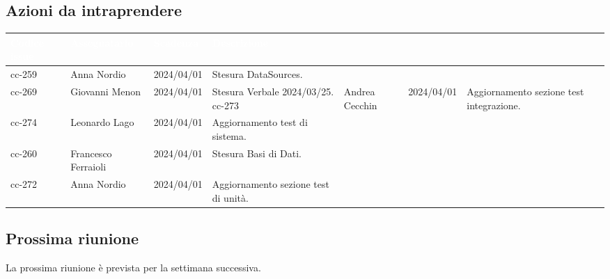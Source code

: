 \subsection{Azioni da intraprendere}
{
    \setlength{\tabcolsep}{10pt}
            \renewcommand{\arraystretch}{1.5}
            \begin{tabularx}{\textwidth}{| l | l | l | X |}
                 \hline
                 \textbf{\textcolor{white}{Codice issue}} & \textbf{\textcolor{white}{Assegnatario}} & \textbf{\textcolor{white}{Scadenza}} & \textbf{\textcolor{white}{Descrizione}} \\
                 \hline
                 cc-259 & Anna Nordio & 2024/04/01 & Stesura DataSources. \\
                 \hline
                 cc-269 & Giovanni Menon & 2024/04/01 & Stesura Verbale 2024/03/25.
                 \hline
                 cc-273 & Andrea Cecchin & 2024/04/01 & Aggiornamento sezione test integrazione. \\
                 \hline
                 cc-274 & Leonardo Lago & 2024/04/01 & Aggiornamento test di sistema. \\
                \hline
                 cc-260 & Francesco Ferraioli & 2024/04/01 & Stesura Basi di Dati. \\
                 \hline
                  cc-272 & Anna Nordio & 2024/04/01 & Aggiornamento sezione test di unità. \\
                 \hline
            \end{tabularx}
}


\subsection{Prossima riunione} \label{subsec:riunione}
La prossima riunione è prevista per la settimana successiva.
